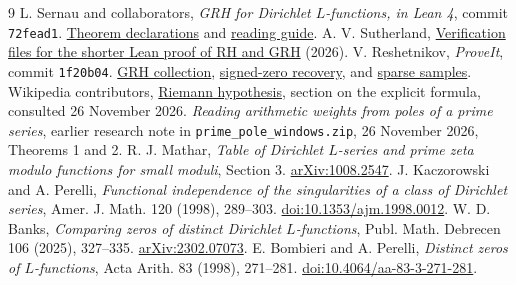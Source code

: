 \documentclass[11pt]{article}
\begin{document}
\begin{thebibliography}{9}\small
{} L. Sernau and collaborators, \emph{GRH for Dirichlet $L$-functions, in Lean 4}, commit \texttt{72fead1}.
\href{https://github.com/lsernau/grh-lean/blob/72fead102f663d5c7a407964a13dc0cf9d977207/grh/src/Main.lean}{Theorem declarations} and
\href{https://github.com/lsernau/grh-lean/blob/72fead102f663d5c7a407964a13dc0cf9d977207/grh/GUIDE.md}{reading guide}.
 A. V. Sutherland, \href{https://math.mit.edu/~drew/shortgrh/}{Verification files for the shorter Lean proof of RH and GRH} (2026).
 V. Reshetnikov, \emph{ProveIt}, commit \texttt{1f20b04}.
\href{https://github.com/VladimirReshetnikov/ProveIt/tree/1f20b04e3f8d78f16d1a873547d90554e46e40bf/Analysis/GeneralizedRiemannHypothesis}{GRH collection},
\href{https://github.com/VladimirReshetnikov/ProveIt/blob/1f20b04e3f8d78f16d1a873547d90554e46e40bf/Analysis/GeneralizedRiemannHypothesis/Research/grh-torsion-and-zero-data/recovery.tex}{signed-zero recovery}, and
\href{https://github.com/VladimirReshetnikov/ProveIt/blob/1f20b04e3f8d78f16d1a873547d90554e46e40bf/Analysis/GeneralizedRiemannHypothesis/Research/grh-torsion-and-prime-sampling/prime-sampling.tex}{sparse samples}.
 Wikipedia contributors, \href{https://en.wikipedia.org/wiki/Riemann_hypothesis}{Riemann hypothesis}, section on the explicit formula, consulted 26 November 2026.
 \emph{Reading arithmetic weights from poles of a prime series}, earlier research note in \texttt{prime\_pole\_windows.zip}, 26 November 2026, Theorems 1 and 2.
 R. J. Mathar, \emph{Table of Dirichlet $L$-series and prime zeta modulo functions for small moduli}, Section 3. \href{https://arxiv.org/abs/1008.2547}{arXiv:1008.2547}.
 J. Kaczorowski and A. Perelli, \emph{Functional independence of the singularities of a class of Dirichlet series}, Amer. J. Math. 120 (1998), 289--303. \href{https://doi.org/10.1353/ajm.1998.0012}{doi:10.1353/ajm.1998.0012}.
 W. D. Banks, \emph{Comparing zeros of distinct Dirichlet $L$-functions}, Publ. Math. Debrecen 106 (2025), 327--335. \href{https://arxiv.org/abs/2302.07073}{arXiv:2302.07073}.
 E. Bombieri and A. Perelli, \emph{Distinct zeros of $L$-functions}, Acta Arith. 83 (1998), 271--281. \href{https://doi.org/10.4064/aa-83-3-271-281}{doi:10.4064/aa-83-3-271-281}.
\end{thebibliography}
\end{document}
